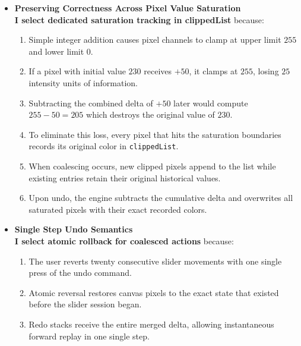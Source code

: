 \documentclass[10pt,a4paper]{article}
\begin{document}
\begin{itemize}[leftmargin=1.2em,noitemsep,topsep=3pt,parsep=2pt]
    \item \textbf{Preserving Correctness Across Pixel Value Saturation}\\[3pt]
    \textbf{I select dedicated saturation tracking in clippedList} because:
    \begin{enumerate}[label=\arabic*),leftmargin=1.5em,noitemsep,topsep=1pt,parsep=1pt]
        \item Simple integer addition causes pixel channels to clamp at upper limit $255$ and lower limit $0$.
        \item If a pixel with initial value $230$ receives $+50$, it clamps at $255$, losing $25$ intensity units of information.
        \item Subtracting the combined delta of $+50$ later would compute $255 - 50 = 205$ which destroys the original value of $230$.
        \item To eliminate this loss, every pixel that hits the saturation boundaries records its original color in \texttt{clippedList}.
        \item When coalescing occurs, new clipped pixels append to the list while existing entries retain their original historical values.
        \item Upon undo, the engine subtracts the cumulative delta and overwrites all saturated pixels with their exact recorded colors.
    \end{enumerate}

    \item \textbf{Single Step Undo Semantics}\\[3pt]
    \textbf{I select atomic rollback for coalesced actions} because:
    \begin{enumerate}[label=\arabic*),leftmargin=1.5em,noitemsep,topsep=1pt,parsep=1pt]
        \item The user reverts twenty consecutive slider movements with one single press of the undo command.
        \item Atomic reversal restores canvas pixels to the exact state that existed before the slider session began.
        \item Redo stacks receive the entire merged delta, allowing instantaneous forward replay in one single step.
    \end{enumerate}
\end{itemize}
\end{document}

